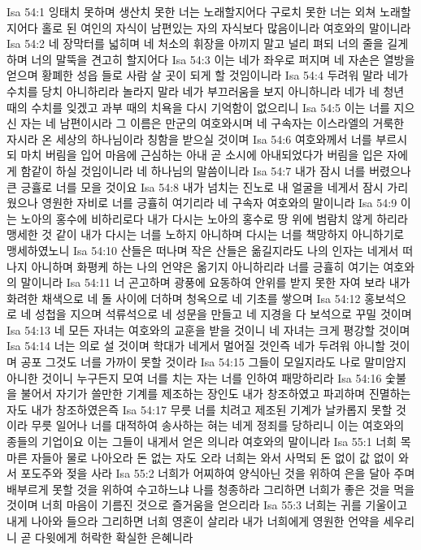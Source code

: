Isa 54:1  잉태치 못하며 생산치 못한 너는 노래할지어다 구로치 못한 너는 외쳐 노래할지어다 홀로 된 여인의 자식이 남편있는 자의 자식보다 많음이니라 여호와의 말이니라
Isa 54:2  네 장막터를 넓히며 네 처소의 휘장을 아끼지 말고 널리 펴되 너의 줄을 길게 하며 너의 말뚝을 견고히 할지어다
Isa 54:3  이는 네가 좌우로 퍼지며 네 자손은 열방을 얻으며 황폐한 성읍 들로 사람 살 곳이 되게 할 것임이니라
Isa 54:4  두려워 말라 네가 수치를 당치 아니하리라 놀라지 말라 네가 부끄러움을 보지 아니하니라 네가 네 청년 때의 수치를 잊겠고 과부 때의 치욕을 다시 기억함이 없으리니
Isa 54:5  이는 너를 지으신 자는 네 남편이시라 그 이름은 만군의 여호와시며 네 구속자는 이스라엘의 거룩한 자시라 온 세상의 하나님이라 칭함을 받으실 것이며
Isa 54:6  여호와께서 너를 부르시되 마치 버림을 입어 마음에 근심하는 아내 곧 소시에 아내되었다가 버림을 입은 자에게 함같이 하실 것임이니라 네 하나님의 말씀이니라
Isa 54:7  내가 잠시 너를 버렸으나 큰 긍휼로 너를 모을 것이요
Isa 54:8  내가 넘치는 진노로 내 얼굴을 네게서 잠시 가리웠으나 영원한 자비로 너를 긍휼히 여기리라 네 구속자 여호와의 말이니라
Isa 54:9  이는 노아의 홍수에 비하리로다 내가 다시는 노아의 홍수로 땅 위에 범람치 않게 하리라 맹세한 것 같이 내가 다시는 너를 노하지 아니하며 다시는 너를 책망하지 아니하기로 맹세하였노니
Isa 54:10  산들은 떠나며 작은 산들은 옮길지라도 나의 인자는 네게서 떠나지 아니하며 화평케 하는 나의 언약은 옮기지 아니하리라 너를 긍휼히 여기는 여호와의 말이니라
Isa 54:11  너 곤고하며 광풍에 요동하여 안위를 받지 못한 자여 보라 내가 화려한 채색으로 네 돌 사이에 더하며 청옥으로 네 기초를 쌓으며
Isa 54:12  홍보석으로 네 성첩을 지으며 석류석으로 네 성문을 만들고 네 지경을 다 보석으로 꾸밀 것이며
Isa 54:13  네 모든 자녀는 여호와의 교훈을 받을 것이니 네 자녀는 크게 평강할 것이며
Isa 54:14  너는 의로 설 것이며 학대가 네게서 멀어질 것인즉 네가 두려워 아니할 것이며 공포 그것도 너를 가까이 못할 것이라
Isa 54:15  그들이 모일지라도 나로 말미암지 아니한 것이니 누구든지 모여 너를 치는 자는 너를 인하여 패망하리라
Isa 54:16  숯불을 불어서 자기가 쓸만한 기계를 제조하는 장인도 내가 창조하였고 파괴하며 진멸하는 자도 내가 창조하였은즉
Isa 54:17  무릇 너를 치려고 제조된 기계가 날카롭지 못할 것이라 무릇 일어나 너를 대적하여 송사하는 혀는 네게 정죄를 당하리니 이는 여호와의 종들의 기업이요 이는 그들이 내게서 얻은 의니라 여호와의 말이니라
Isa 55:1  너희 목마른 자들아 물로 나아오라 돈 없는 자도 오라 너희는 와서 사먹되 돈 없이 값 없이 와서 포도주와 젖을 사라
Isa 55:2  너희가 어찌하여 양식아닌 것을 위하여 은을 달아 주며 배부르게 못할 것을 위하여 수고하느냐 나를 청종하라 그리하면 너희가 좋은 것을 먹을 것이며 너희 마음이 기름진 것으로 즐거움을 얻으리라
Isa 55:3  너희는 귀를 기울이고 내게 나아와 들으라 그리하면 너희 영혼이 살리라 내가 너희에게 영원한 언약을 세우리니 곧 다윗에게 허락한 확실한 은혜니라
